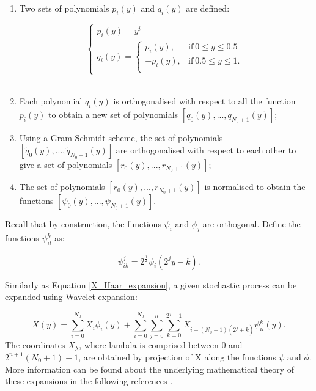 \documentclass[oneside,11pt,times]{book}
\begin{document}
\begin{enumerate}[label=(\roman*)]
\item Two sets of polynomials $p_{i}(y)$ and $q_{i}(y)$ are defined:


\begin{equation*}
\label{Alpert1}
\begin{cases}
p_{i}(y) = y^{i}\\
q_{i}(y) =\begin{cases}
p_{i}(y), &\text{if} \ 0 \leq y \le 0.5\\
-p_{i}(y), &\text{if} \ 0.5 \leq y \le 1.\\
\end{cases}
\end{cases}
\end{equation*}
\

\item Each polynomial $q_{i}(y)$ is orthogonalised with respect to all the function $p_{i}(y)$ to obtain a new set of polynomials $[\tilde{q}_{0}(y),...,\tilde{q}_{N_{0}+1}(y)]$;
\item Using a Gram-Schmidt scheme, the set of polynomials $[\tilde{q}_{0}(y),...,\tilde{q}_{N_{0}+1}(y)]$ are orthogonalised with respect to each other to give a set of polynomials $[r_{0}(y),...,r_{N_{0}+1}(y)]$;
\item The set of polynomials $[r_{0}(y),...,r_{N_{0}+1}(y)]$ is normalised to obtain the functions $[\psi_{0}(y),...,\psi_{N_{0}+1}(y)]$.
\end{enumerate}
Recall that by construction, the functions $\psi_{i}$ and $\phi_{j}$ are orthogonal. Define the functions $\psi_{il}^{k}$ as:

\begin{equation}
\label{waveletFunction}
   \psi_{ik}^{j} = 2^{\frac{j}{2}}\psi_{i}(2^{j}y-k).
\end{equation}

Similarly as Equation \eqref{X_Haar_expansion}, a given stochastic process can be expanded using Wavelet expansion:

\begin{equation}
\label{X_exp_wavelet}
   X(y) = \sum_{i=0}^{N_{0}} X_{i}\phi_{i}(y) + \sum_{i=0}^{N_{0}}\sum_{j=0}^{n}\sum_{k=0}^{2^{j}-1}X_{i+(N_{0}+1)(2^{j} + k )}\psi_{il}^{k}(y).
\end{equation}
The coordinates $X_{\lambda}$, where lambda is comprised between 0 and $2^{n+1}(N_{0}+1)-1$, are obtained by projection of X along the functions $\psi$ and $\phi$. More information can be found about the underlying mathematical theory of these expansions in the following references .
\end{document}

